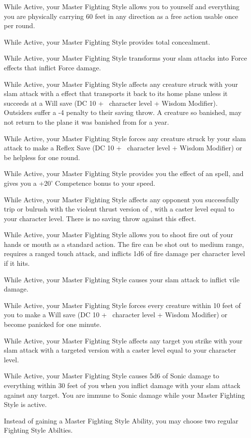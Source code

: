 \begin{awesomelist}
    \item{While Active, your Master Fighting Style allows you to  yourself and everything you are physically carrying 60 feet in any direction as a free action usable once per round.}
    \item{While Active, your Master Fighting Style provides total concealment.}
    \item{While Active, your Master Fighting Style transforms your slam attacks into Force effects that inflict Force damage.}
    \item{While Active, your Master Fighting Style affects any creature struck with your slam attack with a  effect that transports it back to its home plane unless it succeeds at a Will save (DC 10 + \half\  character level + Wisdom Modifier). Outsiders suffer a -4 penalty to their saving throw. A creature so banished, may not return to the plane it was banished from for a year.}
    \item{While Active, your Master Fighting Style forces any creature struck by your slam attack to make a Reflex Save (DC 10 + \half\  character level + Wisdom Modifier) or be helpless for one round.}
    \item{While Active, your Master Fighting Style provides you the effect of an  spell, and gives you a +20' Competence bonus to your speed.}
    \item{While Active, your Master Fighting Style affects any opponent you successfully trip or bulrush with the violent thrust version of , with a caster level equal to your character level. There is no saving throw against this effect.}
    \item{While Active, your Master Fighting Style allows you to shoot fire out of your hands or mouth as a standard action. The fire can be shot out to medium range, requires a ranged touch attack, and inflicts 1d6 of fire damage per character level if it hits.}
    \item{While Active, your Master Fighting Style causes your slam attack to inflict vile damage.}
    \item{While Active, your Master Fighting Style forces every creature within 10 feet of you to make a Will save (DC 10 + \half\  character level + Wisdom Modifier) or become panicked for one minute.}
    \item{While Active, your Master Fighting Style affects any target you strike with your slam attack with a targeted version  with a caster level equal to your character level.}
    \item{While Active, your Master Fighting Style causes 5d6 of Sonic damage to everything within 30 feet of you when you inflict damage with your slam attack against any target. You are immune to Sonic damage while your Master Fighting Style is active.}
    \item{Instead of gaining a Master Fighting Style Ability, you may choose two regular Fighting Style Abilties.}
\end{awesomelist}

